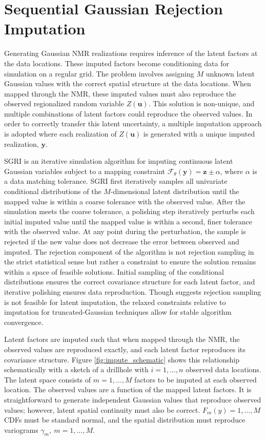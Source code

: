 \FloatBarrier
\section{Sequential Gaussian Rejection Imputation}
\label{sec:05sgri}

Generating Gaussian \gls{NMR} realizations requires inference of the latent factors at the data locations. These imputed factors become conditioning data for simulation on a regular grid. The problem involves assigning $M$ unknown latent Gaussian values with the correct spatial structure at the data locations. When mapped through the \gls{NMR}, these imputed values must also reproduce the observed regionalized random variable $Z(\mathbf{u})$. This solution is non-unique, and multiple combinations of latent factors could reproduce the observed values. In order to correctly transfer this latent uncertainty, a multiple imputation \citep{barnett2015multivariate} approach is adopted where each realization of $Z(\mathbf{u})$ is generated with a unique imputed realization, $\mathbf{y}$.

\Gls{SGRI} is an iterative simulation algorithm for imputing continuous latent Gaussian variables subject to a mapping constraint $\mathcal{F}_{\theta}\left(\mathbf{y}\right)=\mathbf{z} \pm \alpha$, where $\alpha$ is a data matching tolerance. \Gls{SGRI} first iteratively samples all univariate conditional distributions of the $M$-dimensional latent distribution until the mapped value is within a coarse tolerance with the observed value. After the simulation meets the coarse tolerance, a polishing step iteratively perturbs each initial imputed value until the mapped value is within a second, finer tolerance with the observed value. At any point during the perturbation, the sample is rejected if the new value does not decrease the error between observed and imputed. The rejection component of the algorithm is not rejection sampling in the strict statistical sense but rather a constraint to ensure the solution remains within a space of feasible solutions. Initial sampling of the conditional distributions ensures the correct covariance structure for each latent factor, and iterative polishing ensures data reproduction. Though \cite{armstrong2011plurigaussian} suggests rejection sampling is not feasible for latent imputation, the relaxed constraints relative to imputation for truncated-Gaussian techniques allow for stable algorithm convergence.

Latent factors are imputed such that when mapped through the \gls{NMR}, the observed values are reproduced exactly, and each latent factor reproduces its covariance structure. Figure \ref{fig:impute_schematic} shows this relationship schematically with a sketch of a drillhole with $i=1,\dots,n$ observed data locations. The latent space consists of $m=1,\dots,M$ factors to be imputed at each observed location. The observed values are a function of the mapped latent factors. It is straightforward to generate independent Gaussian values that reproduce observed values; however, latent spatial continuity must also be correct. $F_{m}(y)=1,\dots,M$ \glspl{CDF} must be standard normal, and the spatial distribution must reproduce variograms $\gamma_{m}, \ m=1,\dots,M$.

